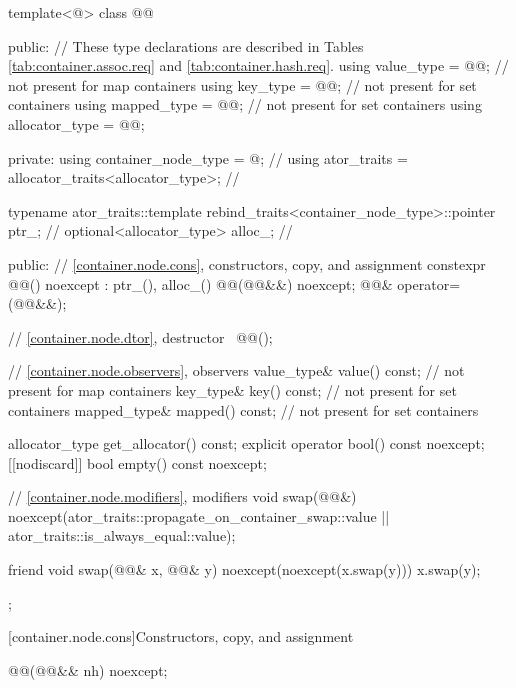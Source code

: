 \begin{codeblock}
template<@\unspecnc@>
class @@ {
public:
  // These type declarations are described in Tables \ref{tab:container.assoc.req} and \ref{tab:container.hash.req}.
  using value_type     = @\seebelownc{}@;     // not present for map containers
  using key_type       = @\seebelownc{}@;     // not present for set containers
  using mapped_type    = @\seebelownc{}@;     // not present for set containers
  using allocator_type = @\seebelownc{}@;

private:
  using container_node_type = @\unspecnc@;                  // \expos
  using ator_traits = allocator_traits<allocator_type>;     // \expos

  typename ator_traits::template
    rebind_traits<container_node_type>::pointer ptr_;       // \expos
  optional<allocator_type> alloc_;                          // \expos

public:
  // \ref{container.node.cons}, constructors, copy, and assignment
  constexpr @@() noexcept : ptr_(), alloc_() {}
  @@(@@&&) noexcept;
  @@& operator=(@@&&);

  // \ref{container.node.dtor}, destructor
  ~@@();

  // \ref{container.node.observers}, observers
  value_type& value() const;            // not present for map containers
  key_type& key() const;                // not present for set containers
  mapped_type& mapped() const;          // not present for set containers

  allocator_type get_allocator() const;
  explicit operator bool() const noexcept;
  [[nodiscard]] bool empty() const noexcept;

  // \ref{container.node.modifiers}, modifiers
  void swap(@@&)
    noexcept(ator_traits::propagate_on_container_swap::value ||
             ator_traits::is_always_equal::value);

  friend void swap(@@& x, @@& y) noexcept(noexcept(x.swap(y))) {
    x.swap(y);
  }
};
\end{codeblock}

[container.node.cons]{Constructors, copy, and assignment}

\begin{itemdecl}
@@(@@&& nh) noexcept;
\end{itemdecl}


